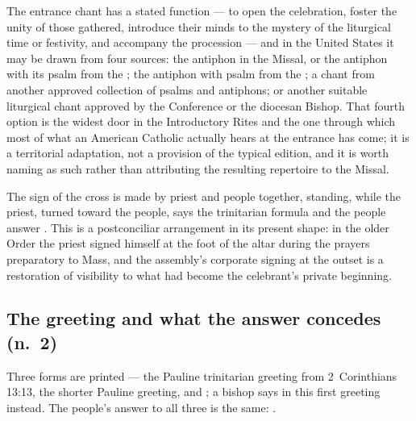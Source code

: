 The entrance chant has a stated function --- to open the celebration, foster the unity of those
gathered, introduce their minds to the mystery of the liturgical time or festivity, and
accompany the procession --- and in the United States it may be drawn from four sources: the
antiphon in the Missal, or the antiphon with its psalm from the ; the
antiphon with psalm from the ; a chant from another approved collection
of psalms and antiphons; or another suitable liturgical chant approved by the Conference or the
diocesan Bishop. That
fourth option is the widest door in the Introductory Rites and the one through which most of
what an American Catholic actually hears at the entrance has come; it is a territorial
adaptation, not a provision of the typical edition, and it is worth naming as such rather than
attributing the resulting repertoire to the Missal.

The sign of the cross is made by priest and people together, standing, while the priest, turned
toward the people, says the trinitarian formula and the people answer . This is a
postconciliar arrangement in its present shape: in the older Order the priest signed himself at
the foot of the altar during the prayers preparatory to Mass, and the assembly's corporate
signing at the outset is a restoration of visibility to what had become the celebrant's private
beginning.

\subsection{The greeting and what the answer concedes (n.\ 2)}

Three forms are printed --- the Pauline trinitarian greeting from 2~Corinthians 13:13, the
shorter Pauline greeting, and ; a bishop says  in this
first greeting instead. The people's answer to all three is the same: .

